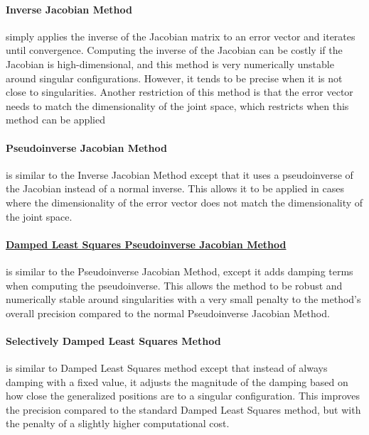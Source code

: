 \paragraph{Inverse Jacobian Method} simply applies the inverse of the Jacobian matrix to an error vector and iterates until convergence. Computing the inverse of the Jacobian can be costly if the Jacobian is high-dimensional, and this method is very numerically unstable around singular configurations. However, it tends to be precise when it is not close to singularities. Another restriction of this method is that the error vector needs to match the dimensionality of the joint space, which restricts when this method can be applied

\paragraph{Pseudoinverse Jacobian Method} is similar to the Inverse Jacobian Method except that it uses a pseudoinverse of the Jacobian instead of a normal inverse. This allows it to be applied in cases where the dimensionality of the error vector does not match the dimensionality of the joint space.

\paragraph{\underline{Damped Least Squares Pseudoinverse Jacobian Method}} is similar to the Pseudoinverse Jacobian Method, except it adds damping terms when computing the pseudoinverse. This allows the method to be robust and numerically stable around singularities with a very small penalty to the method's overall precision compared to the normal Pseudoinverse Jacobian Method.

\paragraph{Selectively Damped Least Squares Method\cite{Buss2005sdls}} is similar to Damped Least Squares method except that instead of always damping with a fixed value, it adjusts the magnitude of the damping based on how close the generalized positions are to a singular configuration. This improves the precision compared to the standard Damped Least Squares method, but with the penalty of a slightly higher computational cost.

